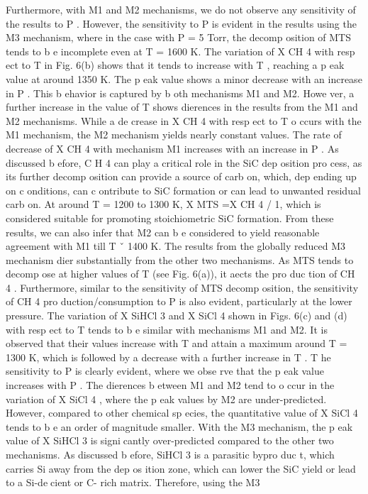 \documentclass[10pt, letterpaper]{article}
\begin{document}
Furthermore, with M1 and M2 mechanisms, we do not observe any sensitivity of the results to
P
. However,
the sensitivity to
P
is evident in the results using the M3 mechanism, where in the case with
P
= 5 Torr,
the decomp osition of MTS tends to b e incomplete even at
T
= 1600 K.
The variation of
X
CH
4
with resp ect to
T
in Fig. 6(b) shows that it tends to increase with
T
, reaching a
p eak value at around 1350 K. The p eak value shows a minor decrease with an increase in
P
. This b ehavior is
captured by b oth mechanisms M1 and M2. Howe ver, a further increase in the value of
T
shows dierences in
the results from the M1 and M2 mechanisms. While a de crease in
X
CH
4
with resp ect to
T
o ccurs with the M1
mechanism, the M2 mechanism yields nearly constant values. The rate of decrease of
X
CH
4
with mechanism
M1 increases with an increase in
P
. As discussed b efore, C H
4
can play a critical role in the SiC dep osition
pro cess, as its further decomp osition can provide a source of carb on, which, dep ending up on c onditions,
can c ontribute to SiC formation or can lead to unwanted residual carb on. At around
T
= 1200
to
1300 K,
X
MTS
=X
CH
4
/
1, which is considered suitable for promoting stoichiometric SiC formation. From these
results, we can also infer that M2 can b e considered to yield reasonable agreement with M1 till
T
ˇ
1400 K.
The results from the globally reduced M3 mechanism dier substantially from the other two mechanisms. As
MTS tends to decomp ose at higher values of
T
(see Fig. 6(a)), it aects the pro duc tion of CH
4
. Furthermore,
similar to the sensitivity of MTS decomp osition, the sensitivity of CH
4
pro duction/consumption to
P
is also
evident, particularly at the lower pressure.
The variation of
X
SiHCl
3
and
X
SiCl
4
shown in Figs. 6(c) and (d) with resp ect to
T
tends to b e similar
with mechanisms M1 and M2. It is observed that their values increase with
T
and attain a maximum around
T
= 1300 K, which is followed by a decrease with a further increase in
T
. T he sensitivity to
P
is clearly
evident, where we obse rve that the p eak value increases with
P
. The dierences b etween M1 and M2 tend
to o ccur in the variation of
X
SiCl
4
, where the p eak values by M2 are under-predicted. However, compared
to other chemical sp ecies, the quantitative value of
X
SiCl
4
tends to b e an order of magnitude smaller. With
the M3 mechanism, the p eak value of
X
SiHCl
3
is signicantly over-predicted compared to the other two
mechanisms. As discussed b efore, SiHCl
3
is a parasitic bypro duc t, which carries Si away from the dep os ition
zone, which can lower the SiC yield or lead to a Si-decient or C- rich matrix. Therefore, using the M3
\end{document}
